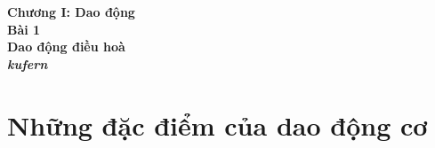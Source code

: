 \documentclass[12pt]{article}
\begin{document}
\begin{titlepage}
\centering
{\large\bfseries Chương I: Dao động} \\
\vspace{12px}
{\large\bfseries Bài 1} \\
\vspace{18px}
{\LARGE\bfseries Dao động điều hoà} \\
\vspace{14px}
{\Large\bfseries\itshape kufern} \\
\vspace{5cm}

\end{titlepage}

\section{Những đặc điểm của dao động cơ}
\end{document}
